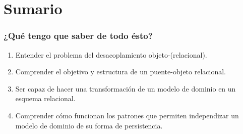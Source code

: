\documentclass[a4paper,slidestop,xcolor=pst,blue]{beamer}
\begin{document}
%
%


%

\section{Sumario}

\begin{frame}[c]
    \frametitle{¿Qué tengo que saber de todo ésto?}
    \begin{enumerate}[<+->]
        \item Entender el problema del desacoplamiento objeto-(relacional).
        \item Comprender el objetivo y estructura de un puente-objeto relacional.
        \item Ser capaz de hacer una transformación de un modelo de dominio en un esquema relacional.
        \item Comprender cómo funcionan los patrones que permiten independizar un modelo de dominio de su forma de persistencia.
    \end{enumerate}
\end{frame}
\end{document}
